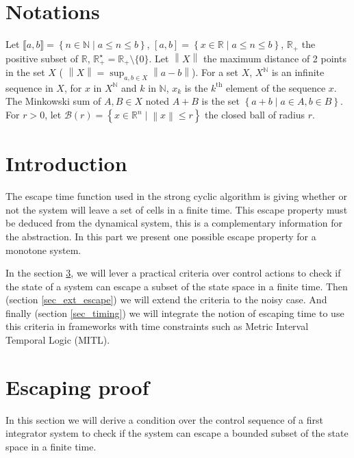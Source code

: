\section{Notations}

Let $\llbracket a,b \rrbracket = \left \{n \in \mathbb{N} \mid a \leq n \leq b \right \}$, $\left [ a,b \right ]= \left \{x \in \mathbb{R} \mid a \leq n \leq b \right \}$, $\mathbb{R}_+$ the positive subset of $\mathbb{R}$, $\mathbb{R}_+^\star = \mathbb{R}_+ \setminus \{0\}$.
Let $\left \| X \right \|$ the maximum distance of 2 points in the set $X$ ( $\left \| X \right \| = \sup_{a,b \in X} \left \| a-b\right \|$).
For a set $X$, $X^{\mathbb{N}}$ is an infinite sequence in $X$, for $x$ in $X^{\mathbb{N}}$ and $k$ in $\mathbb{N}$, $x_k$ is the $k^{\textrm{th}}$ element of the sequence $x$.
The Minkowski sum of $A,B \in X$ noted $A+B$ is the set $\left \{a+b \mid a \in A, b\in B \right \}$.
For $r>0$, let $\mathcal{B}(r) = \left \{ x \in \mathbb{R}^n \mid \left \| x \right \| \leq r \right \}$ the closed ball of radius $r$.

\section{Introduction}
The escape time function used in the strong cyclic algorithm is giving whether or not the system will leave a set of cells in a finite time.
This escape property must be deduced from the dynamical system, this is a complementary information for the abstraction.
In this part we present one possible escape property for a monotone system.

In the section \ref{sec_escape}, we will lever a practical criteria over control actions to check if the state of a system can escape a subset of the state space in a finite time.
Then (section \ref{sec_ext_escape}) we will extend the criteria to the noisy case.
And finally (section \ref{sec_timing}) we will integrate the notion of escaping time to use this criteria in frameworks with time constraints such as Metric Interval Temporal Logic (MITL).


\section{Escaping proof}\label{sec_escape}
In this section we will derive a condition over the control sequence of a first integrator system to check if the system can escape a bounded subset of the state space in a finite time.

